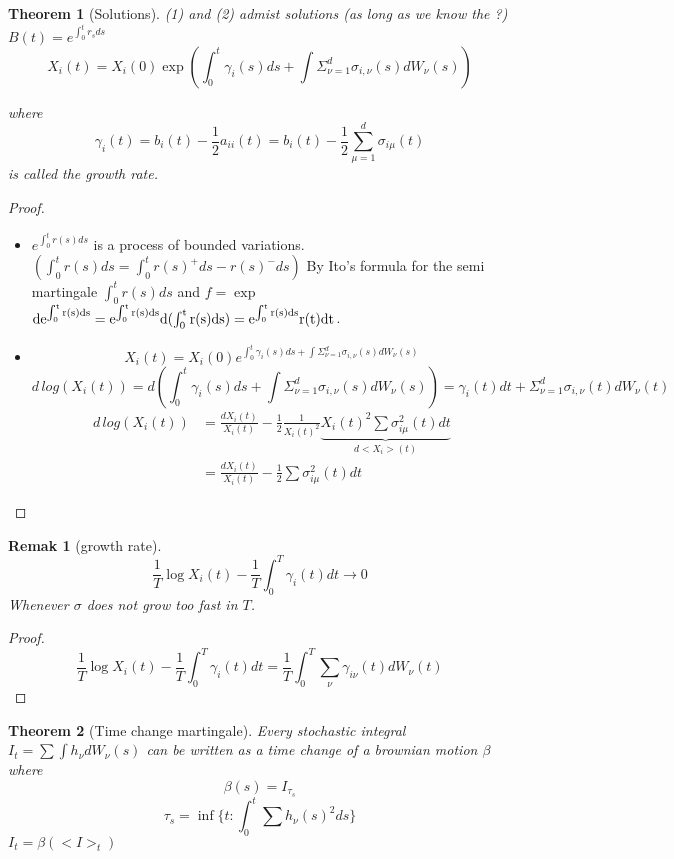 \documentclass{article} \usepackage[utf8]{inputenc}
\newtheorem{theorem}{Theorem}
\newtheorem{remark}{Remak}
\begin{document}
\begin{theorem}[Solutions]
  (1) and (2) admist solutions (as long as we know the ?)
  $B(t) = e^{\int_0^t r_s ds}$
  $$X_i(t) = X_i(0) \exp({\int_0^t \gamma_i(s) ds + \int \Sigma_{\nu=1}^d \sigma_{i,\nu}(s) dW_{\nu}(s)})$$
  
  where
  $$\gamma_i(t) = b_i(t) - \frac12 a_{ii}(t) = b_i(t) - \frac12 \sum_{\mu=1}^d \sigma_{i\mu}(t)$$
  is called the growth rate.
\end{theorem}
\begin{proof}
  \begin{itemize}
  \item $e^{\int_0^t r(s) ds}$ is a process of bounded variations.
    $( \int_0^t r(s)ds = \int_0^t r(s)^+ds - r(s)^-ds )$ By Ito's
    formula for the semi martingale $\int_0^t r(s)ds$ and $f = \exp$
    $\rm de^{\int_0^t r(s)\rm ds} = e^{\int_0^t r(s)\rm ds} \rm
    d(\int_0^t r(s) \rm ds) = e^{\int_0^t r(s)\rm ds} r(t) dt$.
  \item 
    $$X_i(t) = X_i(0) e^{\int_0^t \gamma_i(s) ds + \int \Sigma_{\nu=1}^d \sigma_{i,\nu}(s) dW_{\nu}(s)}$$
    $$d \, log(X_i(t)) = d(\int_0^t \gamma_i(s) ds + \int \Sigma_{\nu=1}^d \sigma_{i,\nu}(s) dW_{\nu}(s)) = \gamma_i(t) dt + \Sigma_{\nu=1}^d \sigma_{i,\nu}(t) dW_{\nu}(t)$$
    \begin{align*}
      d \, log(X_i(t)) &= \frac{dX_i(t)}{X_i(t)} - \frac12 \frac1{X_i(t)^2} \underbrace{X_i(t)^2 \sum \sigma_{i\mu}^2(t) dt}_{d<X_i>(t)}\\
                       &= \frac{dX_i(t)}{X_i(t)} - \frac12 \sum \sigma_{i\mu}^2(t) dt
    \end{align*}

  \end{itemize}

\end{proof}

\begin{remark}
  [growth rate]
  $$\frac1T \log X_i(t) - \frac1T \int_0^T \gamma_i(t)dt \rightarrow 0$$
  Whenever $\sigma$ does not grow too fast in $T$.
\end{remark}
\begin{proof}
  $$\frac1T \log X_i(t) - \frac1T \int_0^T \gamma_i(t)dt = \frac1T \int_0^T \sum_{\nu} \gamma_{i\nu}(t) dW_\nu(t)$$
\end{proof}

\begin{theorem}[Time change martingale]
  Every stochastic integral $I_t = \sum \int h_{\nu} dW_{\nu}(s)$ can be written as a time change of a brownian motion $\beta$ where
  $$\beta(s) = I_{\tau_s}$$
  $$\tau_s = \inf \{ t : \int_0^t \sum h_{\nu}(s)^2 ds \}$$
  $I_t = \beta(<I>_t)$
\end{theorem}
\end{document}
